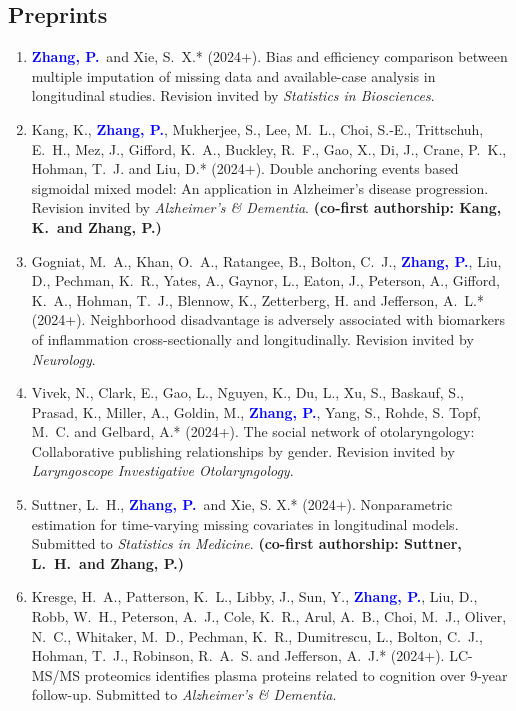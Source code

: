 \documentclass[12pt]{article}
\newcommand{\PZnot}{\textcolor{blue}{\textbf{Zhang, P.}}}
\begin{document}
	\subsection*{Preprints}
	\begin{enumerate}						 
	 	\item \PZnot\ and {\sc Xie, S.\ X.*} (2024+). Bias 
	 	and efficiency comparison between multiple imputation of 
	 	missing data and available-case analysis in longitudinal 
	 	studies. Revision invited by {\em Statistics in Biosciences}.
		
		\item {\sc Kang, K.}, \PZnot, {\sc Mukherjee, S., Lee, M.\ 
		L., Choi, S.-E., Trittschuh, E.\ H., Mez, J., Gifford, K.\ 
		A., Buckley, R.\ F., Gao, X., Di, J., Crane, P.\ K., Hohman, 
		T.\ J.} and {\sc Liu, D.*} (2024+). Double anchoring events 
		based sigmoidal mixed model: An application in Alzheimer's 
		disease progression. Revision invited by {\em Alzheimer's \& 
		Dementia}. {\bf (co-first authorship: Kang, K.\ and Zhang, 
		P.)}
		
		\item {\sc Gogniat, M.\ A., Khan, O.\ A., Ratangee, B., 
		Bolton, C.\ J.,} \PZnot, {\sc Liu, D., Pechman, K.\ R., 
		Yates, A., Gaynor, L., Eaton, J., Peterson, A., Gifford, K.\ 
		A., Hohman, T.\ J., Blennow, K., Zetterberg, H.} and {\sc 
		Jefferson, A.\ L.*} (2024+). Neighborhood disadvantage is 
		adversely associated with biomarkers of inflammation 
		cross-sectionally and longitudinally. Revision invited by 
		{\em 
		Neurology}.
		
		\item {\sc Vivek, N., Clark, E., Gao, L., Nguyen, K., Du, 
		L., Xu, S., Baskauf, S., Prasad, K., Miller, A., Goldin, 
		M.,} \PZnot, {\sc Yang, S., Rohde, S. Topf, M.\ C.} and {\sc 
		Gelbard, A.*} (2024+). The social network of otolaryngology: 
		Collaborative publishing relationships by gender. Revision 
		invited by {\em Laryngoscope Investigative Otolaryngology}.
					
		\item {\sc Suttner, L.\ H.,} \PZnot\ and {\sc Xie, S. X.*} 
		(2024+). Nonparametric estimation for time-varying missing 
		covariates in longitudinal models. Submitted to {\em 
		Statistics in Medicine}. {\bf (co-first authorship: Suttner, 
		L.\ H.\ and Zhang, P.)}
		
		\item {\sc Kresge, H.\ A., Patterson, K.\ L., Libby, J., 
		Sun, Y.,} \PZnot, {\sc Liu, D., Robb, W.\ H., Peterson, A.\ 
		J., Cole, K.\ R., Arul, A.\ B., Choi, M.\ J., Oliver, N.\ 
		C., Whitaker, M.\ D., Pechman, K.\ R., Dumitrescu, L., 
		Bolton, C.\ J., Hohman, T.\ J., Robinson, R.\ A.\ S.} and 
		{\sc Jefferson, A.\ J.*} (2024+). LC-MS/MS proteomics 
		identifies plasma proteins related to cognition over 9-year 
		follow-up. Submitted to {\em Alzheimer's \& Dementia}.
		
	\end{enumerate}
	
\end{document}
